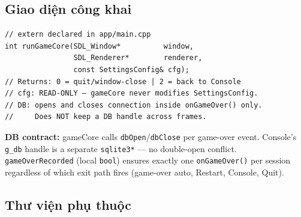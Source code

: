 \documentclass[12pt,a4paper]{article}
\begin{document}
\begin{center}
\end{center}

\subsection{Giao diện công khai}

\begin{verbatim}
// extern declared in app/main.cpp
int runGameCore(SDL_Window*          window,
                SDL_Renderer*        renderer,
                const SettingsConfig& cfg);
// Returns: 0 = quit/window-close | 2 = back to Console
// cfg: READ-ONLY — gameCore never modifies SettingsConfig.
// DB: opens and closes connection inside onGameOver() only.
//     Does NOT keep a DB handle across frames.
\end{verbatim}

\noindent\textbf{DB contract:} gameCore calls \texttt{dbOpen}/\texttt{dbClose}
per game-over event. Console's \texttt{g\_db} handle is a separate
\texttt{sqlite3*} — no double-open conflict.
\texttt{gameOverRecorded} (local \texttt{bool}) ensures exactly one
\texttt{onGameOver()} per session regardless of which exit path fires
(game-over auto, Restart, Console, Quit).

\subsection{Thư viện phụ thuộc}
\end{document}
